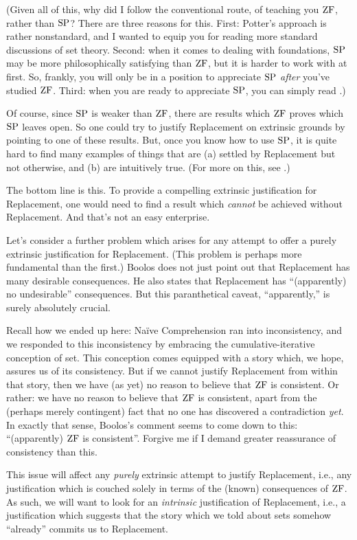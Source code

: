 \documentclass[../../../include/open-logic-section]{subfiles}
\begin{document}
(Given all of this, why did I follow the conventional route, of
teaching you $\mathrm{ZF}$, rather than $\mathrm{SP}$? There are three reasons for
this. First: Potter's approach is rather nonstandard, and I wanted to
equip you for reading more standard discussions of set theory. Second:
when it comes to dealing with foundations, $\mathrm{SP}$ may be more
philosophically satisfying than $\mathrm{ZF}$, but it is harder to work with
at first. So, frankly, you will only be in a position to appreciate
$\mathrm{SP}$ \emph{after} you've studied $\mathrm{ZF}$. Third: when you are ready to
appreciate $\mathrm{SP}$, you can simply read \citealt{Potter2004}.)

Of course, since $\mathrm{SP}$ is weaker than $\mathrm{ZF}$, there are results which
$\mathrm{ZF}$ proves which $\mathrm{SP}$ leaves open. So one could try to justify
Replacement on extrinsic grounds by pointing to one of these results.
But, once you know how to use $\mathrm{SP}$, it is quite hard to find many
examples of things that are (a) settled by Replacement but not
otherwise, and (b) are intuitively true. (For more on this, see
\citealt[\S13.2]{Potter2004}.)

The bottom line is this. To provide a compelling extrinsic
justification for Replacement, one would need to find a result which
\emph{cannot} be achieved without Replacement. And that's not an easy
enterprise. 

Let's consider a further problem which arises for any attempt to offer
a purely extrinsic justification for Replacement. (This problem is
perhaps more fundamental than the first.) Boolos does not just point
out that Replacement has many desirable consequences. He also states
that Replacement has ``(apparently) no undesirable'' consequences. But
this paranthetical caveat, ``apparently,'' is surely absolutely
crucial.

Recall how we ended up here: Na\"ive Comprehension ran into
inconsistency, and we responded to this inconsistency by embracing the
cumulative-iterative conception of set. This conception comes equipped
with a story which, we hope, assures us of its consistency. But if we
cannot justify Replacement from within that story, then we have (as
yet) no reason to believe that $\mathrm{ZF}$ is consistent. Or rather: we have
no reason to believe that $\mathrm{ZF}$ is consistent, apart from the (perhaps
merely contingent) fact that no one has discovered a contradiction
\emph{yet}. In exactly that sense, Boolos's comment seems to come down
to this: ``(apparently) $\mathrm{ZF}$ is consistent''. Forgive me if I demand
greater reassurance of consistency than this. 

This issue will affect any \emph{purely} extrinsic attempt to justify
Replacement, i.e., any justification which is couched solely in terms
of the (known) consequences of $\mathrm{ZF}$. As such, we will want to look
for an \emph{intrinsic} justification of Replacement, i.e., a
justification which suggests that the story which we told about sets
somehow ``already'' commits us to Replacement. 
\end{document}
